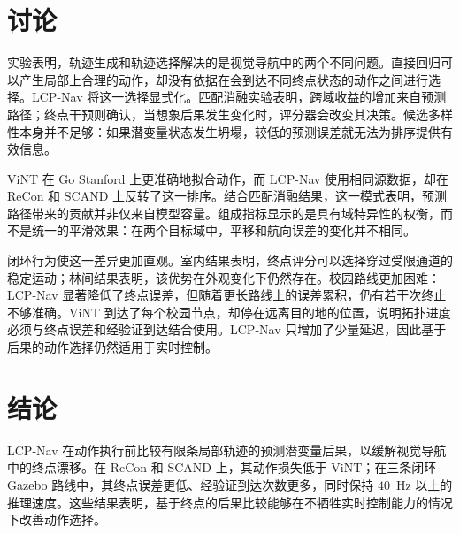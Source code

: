 \documentclass[conference]{IEEEtran}
\begin{document}
\enlargethispage{-1.25in}
\section{讨论}

实验表明，轨迹生成和轨迹选择解决的是视觉导航中的两个不同问题。直接回归可以产生局部上合理的动作，却没有依据在会到达不同终点状态的动作之间进行选择。LCP-Nav 将这一选择显式化。匹配消融实验表明，跨域收益的增加来自预测路径；终点干预则确认，当想象后果发生变化时，评分器会改变其决策。候选多样性本身并不足够：如果潜变量状态发生坍塌，较低的预测误差就无法为排序提供有效信息。

ViNT 在 Go Stanford 上更准确地拟合动作，而 LCP-Nav 使用相同源数据，却在 ReCon 和 SCAND 上反转了这一排序。结合匹配消融结果，这一模式表明，预测路径带来的贡献并非仅来自模型容量。组成指标显示的是具有域特异性的权衡，而不是统一的平滑效果：在两个目标域中，平移和航向误差的变化并不相同。

闭环行为使这一差异更加直观。室内结果表明，终点评分可以选择穿过受限通道的稳定运动；林间结果表明，该优势在外观变化下仍然存在。校园路线更加困难：LCP-Nav 显著降低了终点误差，但随着更长路线上的误差累积，仍有若干次终止不够准确。ViNT 到达了每个校园节点，却停在远离目的地的位置，说明拓扑进度必须与终点误差和经验证到达结合使用。LCP-Nav 只增加了少量延迟，因此基于后果的动作选择仍然适用于实时控制。

\section{结论}

LCP-Nav 在动作执行前比较有限条局部轨迹的预测潜变量后果，以缓解视觉导航中的终点漂移。在 ReCon 和 SCAND 上，其动作损失低于 ViNT；在三条闭环 Gazebo 路线中，其终点误差更低、经验证到达次数更多，同时保持 $40$~Hz 以上的推理速度。这些结果表明，基于终点的后果比较能够在不牺牲实时控制能力的情况下改善动作选择。
\end{document}
